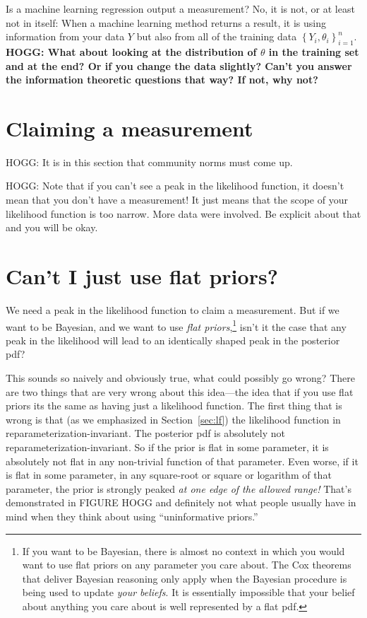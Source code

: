 \documentclass{article}
\newcommand{\sectionname}{Section}
\newcommand{\secref}[1]{\sectionname~\ref{#1}}
\newcommand{\setof}[1]{\left\{{#1}\right\}}
\begin{document}
Is a machine learning regression output a measurement?
No, it is not, or at least not in itself:
When a machine learning method returns a result, it is using information from your data $Y$
but also from all of the training data $\setof{Y_i, \theta_i}_{i=1}^n$.
\textbf{HOGG: What about looking at the distribution of $\theta$ in the training set and at the end? Or if you change the data slightly? Can't you answer the information theoretic questions that way? If not, why not?}

\section{Claiming a measurement}\label{sec:claim}

HOGG: It is in this section that community norms must come up.

HOGG: Note that if you can't see a peak in the likelihood function, it doesn't mean that you don't have a measurement! It just means that the scope of your likelihood function is too narrow. More data were involved. Be explicit about that and you will be okay.

\section{Can't I just use flat priors?}\label{sec:flat}
We need a peak in the likelihood function to claim a measurement.
But if we want to be Bayesian, and we want to use \emph{flat priors},\footnote{%
If you want to be Bayesian, there is almost no context in which you would want to use flat priors on any parameter you care about.
The Cox theorems that deliver Bayesian reasoning only apply when the Bayesian procedure is being used to update \emph{your beliefs}.
It is essentially impossible that your belief about anything you care about is well represented by a flat pdf.}
isn't it the case that any peak in the likelihood will lead to an identically shaped peak in the posterior pdf?

This sounds so naively and obviously true, what could possibly go wrong?
There are two things that are very wrong about this idea---the idea that if you use flat priors its the same as having just a likelihood function.
The first thing that is wrong is that (as we emphasized in \secref{sec:lf}) the likelihood function in reparameterization-invariant.
The posterior pdf is absolutely not reparameterization-invariant.
So if the prior is flat in some parameter, it is absolutely not flat in any non-trivial function of that parameter.
Even worse, if it is flat in some parameter, in any square-root or square or logarithm of that parameter, the prior is strongly peaked \emph{at one edge of the allowed range!}
That's demonstrated in FIGURE HOGG and definitely not what people usually have in mind when they think about using ``uninformative priors.''
\end{document}
